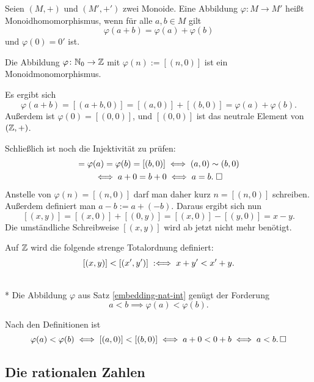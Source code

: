 \begin{Definition}[Monoidhomomorphismus]\newlinefirst
Seien $(M,+)$ und $(M',+')$ zwei Monoide. Eine Abbildung
$\varphi\colon M\to M'$ heißt Monoidhomomorphismus, wenn
für alle $a,b\in M$ gilt
\[\varphi(a+b) = \varphi(a)+\varphi(b)\]
und $\varphi(0)=0'$ ist.
\end{Definition}

\begin{Satz}%
\label{embedding-nat-int}\newlinefirst
Die Abbildung $\varphi\colon\mathbb N_0\to\mathbb Z$ mit $\varphi(n):=[(n,0)]$
ist ein Monoidmonomorphismus.
\end{Satz}
 Es ergibt sich
\[\varphi(a+b) = [(a+b,0)] = [(a,0)]+[(b,0)] = \varphi(a)+\varphi(b).\]
Außerdem ist $\varphi(0)=[(0,0)]$, und $[(0,0)]$
ist das neutrale Element von $(\mathbb Z,+)$.

Schließlich ist noch die Injektivität zu prüfen:
\begin{gather*}
[(a,0)] = \varphi(a) = \varphi(b)  = [(b,0)]\iff (a,0)\sim (b,0)\\
\iff a+0 = b+0 \iff a=b.\;\qedsymbol
\end{gather*}
Anstelle von $\varphi(n)=[(n,0)]$ darf man daher kurz
$n=[(n,0)]$ schreiben. Außerdem definiert man $a-b:=a+(-b)$. Daraus
ergibt sich nun
\[[(x,y)] = [(x,0)]+[(0,y)] = [(x,0)] - [(y,0)] = x-y.\]
Die umständliche Schreibweise $[(x,y)]$ wird ab jetzt nicht
mehr benötigt.

\begin{Definition}\newlinefirst
Auf $\mathbb Z$ wird die folgende strenge Totalordnung definiert:
\[[(x,y)] < [(x',y')] \;:\Longleftrightarrow\; x+y'<x'+y.\]
\end{Definition}

\begin{Satz}\mbox{}\\*
Die Abbildung $\varphi$ aus Satz \ref{embedding-nat-int}
genügt der Forderung
\[a<b \implies \varphi(a)<\varphi(b).\]
\end{Satz}
\begin{Beweis}
Nach den Definitionen ist
\[\varphi(a)<\varphi(b)\iff [(a,0)]<[(b,0)]\iff a+0<0+b\iff a<b.\,\square\]
\end{Beweis}

\subsection{Die rationalen Zahlen}

